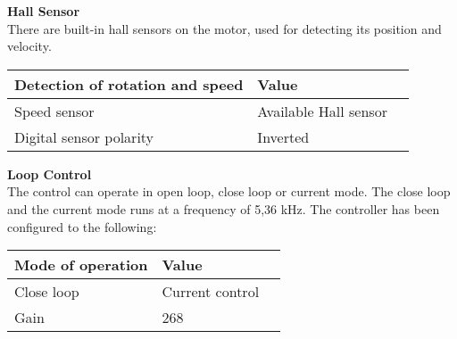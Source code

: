 \textbf{Hall Sensor}\\
There are built-in hall sensors on the motor, used for detecting its position and velocity. 
\begin{table}[H]
	\begin{tabular}{|l|l|p{4.3cm}|}
		\hline%
		\textbf{Detection of rotation and speed}       &  \textbf{Value}         \\
		\hline%
		Speed sensor                                & Available Hall sensor           \\
		\hline%
		Digital sensor polarity							  & Inverted              \\
		\hline%
	\end{tabular}
\end{table}

\textbf{Loop Control}\\
The control can operate in open loop, close loop or current mode. The close loop and the current mode runs at a frequency of 5,36 kHz. The controller has been configured to the following:
\begin{table}[H]
	\begin{tabular}{|l|l|p{4.3cm}|}
		\hline%
		\textbf{Mode of operation}       &  \textbf{Value}         \\
		\hline%
		Close loop                                & Current control           \\
		\hline%
		Gain							  & 268              \\
		\hline%
	\end{tabular}
\end{table}

